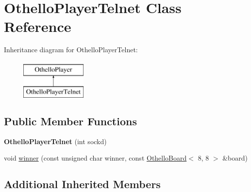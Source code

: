 \hypertarget{classOthelloPlayerTelnet}{\section{Othello\-Player\-Telnet Class Reference}
\label{classOthelloPlayerTelnet}
}
Inheritance diagram for Othello\-Player\-Telnet\-:\begin{figure}[H]
\begin{center}
\leavevmode
\includegraphics[height=2.000000cm]{classOthelloPlayerTelnet}
\end{center}
\end{figure}
\subsection*{Public Member Functions}
\begin{DoxyCompactItemize}
\item 
\hypertarget{classOthelloPlayerTelnet_a6d5600e72342f5bf6ce0c5e9300403a0}{{\bfseries Othello\-Player\-Telnet} (int sockd)}\label{classOthelloPlayerTelnet_a6d5600e72342f5bf6ce0c5e9300403a0}

\item 
void \hyperlink{classOthelloPlayerTelnet_a2903532fbbc2de163b4bf3c14e214dfe}{winner} (const unsigned char winner, const \hyperlink{classOthelloBoard}{Othello\-Board}$<$ 8, 8 $>$ \&board)
\end{DoxyCompactItemize}
\subsection*{Additional Inherited Members}


